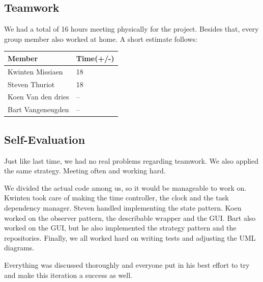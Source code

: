 		\subsection{Teamwork}
		
		
		We had a total of 16 hours meeting physically for the project. Besides that, every group member also worked at home. A short estimate follows:\\
		 \begin{tabular}{l|l}
		Member & Time(+/-)\\ \hline
		Kwinten Missiaen & 18\\
		Steven Thuriot & 18\\
		Koen Van den dries & --\\
		Bart Vangeneugden & --\\
		\end{tabular}
		\subsection{Self-Evaluation}
		Just like last time, we had no real problems regarding teamwork. We also applied the same strategy. Meeting often and working hard.
	
		We divided the actual code among us, so it would be manageable to work on. Kwinten took care of making the time controller, the clock and the task dependency manager. Steven handled implementing the state pattern. Koen worked on the observer pattern, the describable wrapper and the GUI. Bart also worked on the GUI, but he also implemented the strategy pattern and the repositories. Finally, we all worked hard on writing tests and adjusting the UML diagrams.
	
		Everything was discussed thoroughly and everyone put in his best effort to try and make this iteration a success as well.

